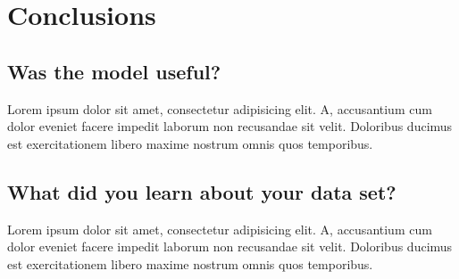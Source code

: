 \section{Conclusions}

\subsection{Was the model useful?}

Lorem ipsum dolor sit amet, consectetur adipisicing elit. A, accusantium cum dolor eveniet facere impedit laborum non recusandae sit velit. Doloribus ducimus est exercitationem libero maxime nostrum omnis quos temporibus.


\subsection{What did you learn about your data set?}

Lorem ipsum dolor sit amet, consectetur adipisicing elit. A, accusantium cum dolor eveniet facere impedit laborum non recusandae sit velit. Doloribus ducimus est exercitationem libero maxime nostrum omnis quos temporibus.


